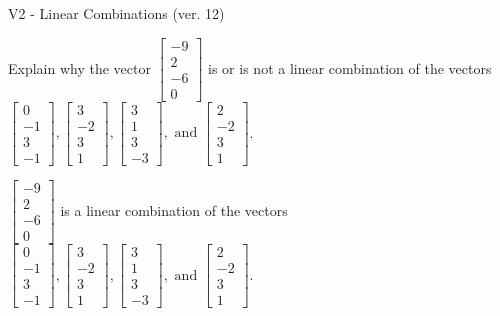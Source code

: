 \begin{exercise}
  \begin{exerciseTitle}V2 - Linear Combinations (ver. 12)\end{exerciseTitle}
  \begin{exerciseStatement}
    Explain why the vector \(\left[\begin{array}{c}
-9 \\
2 \\
-6 \\
0
\end{array}\right]\)  is or is not a linear 
	combination of the vectors \(\left[\begin{array}{c}
0 \\
-1 \\
3 \\
-1
\end{array}\right] , \left[\begin{array}{c}
3 \\
-2 \\
3 \\
1
\end{array}\right] , \left[\begin{array}{c}
3 \\
1 \\
3 \\
-3
\end{array}\right] , \text{ and } \left[\begin{array}{c}
2 \\
-2 \\
3 \\
1
\end{array}\right]\).
	


  \end{exerciseStatement}
  \begin{exerciseAnswer}
   \(\left[\begin{array}{c}
-9 \\
2 \\
-6 \\
0
\end{array}\right]\) 
  	 is  
	a linear combination of the vectors \(\left[\begin{array}{c}
0 \\
-1 \\
3 \\
-1
\end{array}\right] , \left[\begin{array}{c}
3 \\
-2 \\
3 \\
1
\end{array}\right] , \left[\begin{array}{c}
3 \\
1 \\
3 \\
-3
\end{array}\right] , \text{ and } \left[\begin{array}{c}
2 \\
-2 \\
3 \\
1
\end{array}\right]\).


\end{exerciseAnswer}
\end{exercise}
